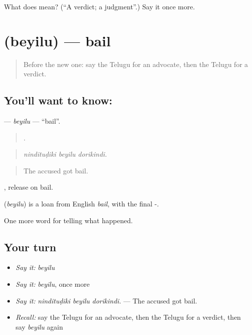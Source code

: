 \begin{tcolorbox}[breakable,colback=teal!4,colframe=teal!35!black,title={Before you move on}]
What does  mean? (\textquotedblleft{}A verdict; a judgment\textquotedblright{}.) Say it once more.
\end{tcolorbox}
\section[\texorpdfstring{\te{బెయిలు} (beyilu)}{బెయిలు (beyilu)}]{ (beyilu) — bail}

\label{lesson:TE-C349-beyilu}



\begin{quote}
Before the new one: say the Telugu for an advocate, then the Telugu for a verdict.
\end{quote}

\subsection*{You'll want to know: }
\textbf{} — \emph{beyilu} — \textquotedblleft{}bail\textquotedblright{}.

\begin{quote}
  .
\end{quote}

\begin{quote}
\emph{nindituḍiki beyilu dorikindi.}
\end{quote}

\begin{quote}
The accused got bail.
\end{quote}

  , release on bail.

\begin{cousinweb}
\textbf{} (\emph{beyilu}) is a loan from English \emph{bail}, with the final -.
\end{cousinweb}

\begin{grammarlens}[title={What you've built}]
One more word for telling what happened.
\end{grammarlens}

\subsection*{Your turn}
\begin{itemize}
\raggedright
  \item \emph{Say it:} \emph{beyilu}
  \item \emph{Say it:} \emph{beyilu}, once more
  \item \emph{Say it:} \emph{nindituḍiki beyilu dorikindi.} — The accused got bail.
  \item \emph{Recall:} say the Telugu for an advocate, then the Telugu for a verdict, then say \emph{beyilu} again
\end{itemize}

